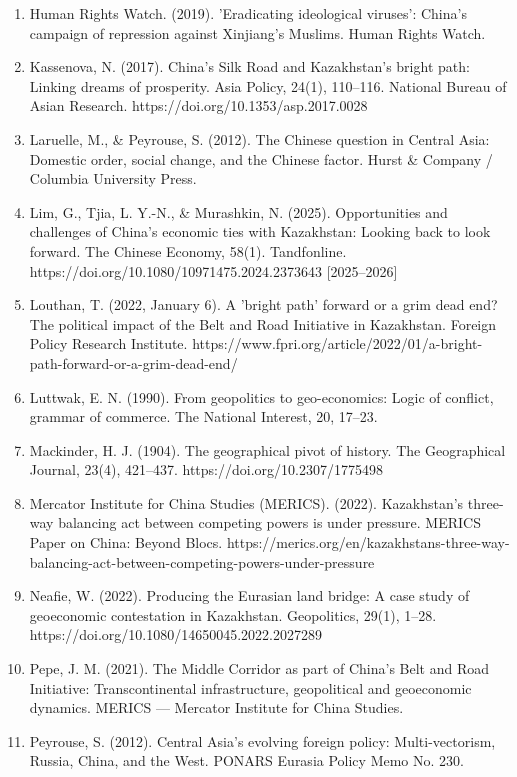 \documentclass[12pt]{article}
\begin{document}
\begin{enumerate}[leftmargin=*]
\item Human Rights Watch. (2019). 'Eradicating ideological viruses': China's campaign of repression against Xinjiang's Muslims. Human Rights Watch.
\item Kassenova, N. (2017). China's Silk Road and Kazakhstan's bright path: Linking dreams of prosperity. Asia Policy, 24(1), 110–116. National Bureau of Asian Research. https://doi.org/10.1353/asp.2017.0028
\item Laruelle, M., \& Peyrouse, S. (2012). The Chinese question in Central Asia: Domestic order, social change, and the Chinese factor. Hurst \& Company / Columbia University Press.
\item Lim, G., Tjia, L. Y.-N., \& Murashkin, N. (2025). Opportunities and challenges of China's economic ties with Kazakhstan: Looking back to look forward. The Chinese Economy, 58(1). Tandfonline. https://doi.org/10.1080/10971475.2024.2373643 [2025–2026]
\item Louthan, T. (2022, January 6). A 'bright path' forward or a grim dead end? The political impact of the Belt and Road Initiative in Kazakhstan. Foreign Policy Research Institute. https://www.fpri.org/article/2022/01/a-bright-path-forward-or-a-grim-dead-end/
\item Luttwak, E. N. (1990). From geopolitics to geo-economics: Logic of conflict, grammar of commerce. The National Interest, 20, 17–23.
\item Mackinder, H. J. (1904). The geographical pivot of history. The Geographical Journal, 23(4), 421–437. https://doi.org/10.2307/1775498
\item Mercator Institute for China Studies (MERICS). (2022). Kazakhstan's three-way balancing act between competing powers is under pressure. MERICS Paper on China: Beyond Blocs. https://merics.org/en/kazakhstans-three-way-balancing-act-between-competing-powers-under-pressure
\item Neafie, W. (2022). Producing the Eurasian land bridge: A case study of geoeconomic contestation in Kazakhstan. Geopolitics, 29(1), 1–28. https://doi.org/10.1080/14650045.2022.2027289
\item Pepe, J. M. (2021). The Middle Corridor as part of China's Belt and Road Initiative: Transcontinental infrastructure, geopolitical and geoeconomic dynamics. MERICS — Mercator Institute for China Studies.
\item Peyrouse, S. (2012). Central Asia's evolving foreign policy: Multi-vectorism, Russia, China, and the West. PONARS Eurasia Policy Memo No. 230.

\end{enumerate}
\end{document}
